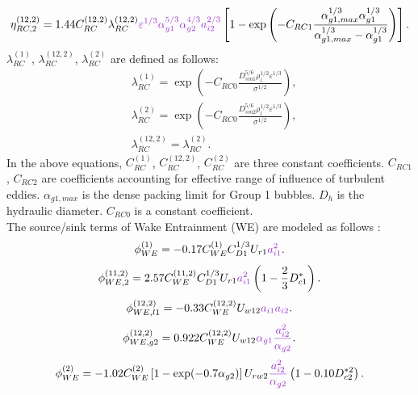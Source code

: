 \begin{equation}
\eta_{RC,2}^{(12,2)} = 1.44 C_{RC}^{(12,2)} \lambda_{RC}^{(12,2)} {\color{mydarkorchid}\varepsilon^{1/3} \alpha_{g1}^{5/3} \alpha_{g2}^{4/3} a_{i2}^{2/3}} \left[ 1 - \exp \left( - C_{RC1} \frac{ \alpha_{g1,max}^{1/3} \alpha_{g1}^{1/3} }{ \alpha_{g1,max}^{1/3} - \alpha_{g1}^{1/3}}\right) \right].
\end{equation}
$\lambda_{RC}^{(1)}$, $\lambda_{RC}^{(12,2)}$, $\lambda_{RC}^{(2)}$ are defined as follows:
 \begin{align}
 & \lambda_{RC}^{(1)} = \exp \left( - C_{RC0} \frac{ D_{sm1}^{5/6} \rho_l^{1/2} \varepsilon^{1/3} }{ \sigma^{1/2} } \right), \\
 & \lambda_{RC}^{(2)} = \exp \left( - C_{RC0} \frac{ D_{sm2}^{5/6} \rho_l^{1/2} \varepsilon^{1/3} }{ \sigma^{1/2} } \right), \\
 & \lambda_{RC}^{(12,2)} = \lambda_{RC}^{(2)}.
 \end{align}
In the above equations, $C_{RC}^{(1)}$, $C_{RC}^{(12,2)}$, $C_{RC}^{(2)}$ are three constant coefficients. $C_{RC1}$, $C_{RC2}$ are coefficients accounting for effective range of influence of turbulent eddies. $\alpha_{g1,max}$ is the dense packing limit for Group 1 bubbles. $D_h$ is the hydraulic diameter. $C_{RC0}$ is a constant coefficient.\\
The source/sink terms of Wake Entrainment (WE) are modeled as follows :
\begin{equation}
\phi_{WE}^{(1)} = - 0.17 C_{WE}^{(1)} C_{D1}^{1/3} U_{r1} {\color{mydarkorchid}a_{i1}^2}.
\end{equation}
\begin{equation}
 \phi_{WE,2}^{(11,2)} = 2.57 C_{WE}^{(11,2)} C_{D1}^{1/3} U_{r1} {\color{mydarkorchid}a_{i1}^2} \left( 1 - \frac{2}{3} D_{c1}^{*} \right).
\end{equation}
\begin{equation}
\phi_{WE,l1}^{(12,2)} = - 0.33 C_{WE}^{(12,2)} U_{w12} {\color{mydarkorchid} a_{i1} a_{i2}}.
\end{equation}
\begin{equation}
\phi_{WE,g2}^{(12,2)} = 0.922 C_{WE}^{(12,2)} U_{w12} {\color{mydarkorchid}\alpha_{g1} \frac{ a_{i2}^2 }{ \alpha_{g2} }}.
\end{equation}
\begin{equation}
\phi_{WE}^{(2)} = -1.02 C_{WE}^{(2)} \left[ 1 - \exp( - 0.7 \alpha_{g2} ) \right] U_{rw2} {\color{mydarkorchid} \frac{ a_{i2}^2 }{ \alpha_{g2} }} \left( 1 - 0.10 D_{c2}^{*2} \right).
\end{equation}
